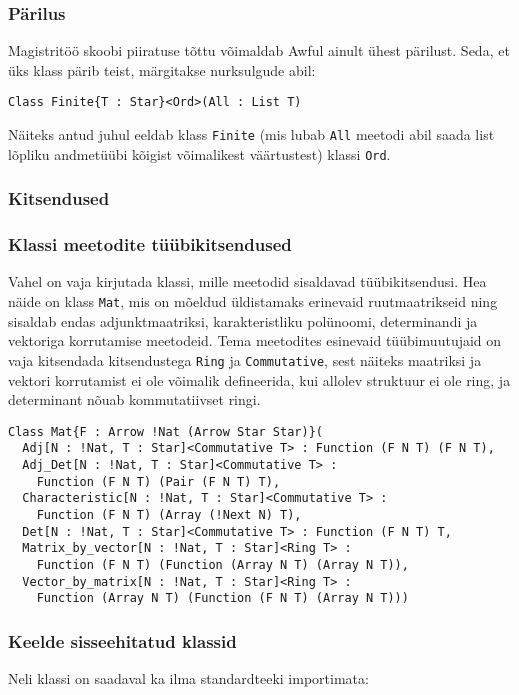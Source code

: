 \documentclass[12pt]{article}
\begin{document}
      \subsubsection{Pärilus}
        Magistritöö skoobi piiratuse tõttu võimaldab Awful ainult ühest pärilust. Seda, et üks klass pärib teist, märgitakse nurksulgude abil:

        \begin{verbatim}Class Finite{T : Star}<Ord>(All : List T)\end{verbatim}

        Näiteks antud juhul eeldab klass \verb!Finite! (mis lubab \verb!All! meetodi abil saada list lõpliku andmetüübi kõigist võimalikest väärtustest) klassi \verb!Ord!.
      \subsubsection{Kitsendused}
        
      \subsubsection{Klassi meetodite tüübikitsendused}
        Vahel on vaja kirjutada klassi, mille meetodid sisaldavad tüübikitsendusi. Hea näide on klass \verb!Mat!, mis on mõeldud üldistamaks erinevaid ruutmaatrikseid ning sisaldab endas adjunktmaatriksi, karakteristliku polünoomi, determinandi ja vektoriga korrutamise meetodeid. Tema meetodites esinevaid tüübimuutujaid on vaja kitsendada kitsendustega \verb!Ring! ja \verb!Commutative!, sest näiteks maatriksi ja vektori korrutamist ei ole võimalik defineerida, kui allolev struktuur ei ole ring, ja determinant nõuab kommutatiivset ringi.

        \begin{verbatim}Class Mat{F : Arrow !Nat (Arrow Star Star)}(
  Adj[N : !Nat, T : Star]<Commutative T> : Function (F N T) (F N T),
  Adj_Det[N : !Nat, T : Star]<Commutative T> :
    Function (F N T) (Pair (F N T) T),
  Characteristic[N : !Nat, T : Star]<Commutative T> :
    Function (F N T) (Array (!Next N) T),
  Det[N : !Nat, T : Star]<Commutative T> : Function (F N T) T,
  Matrix_by_vector[N : !Nat, T : Star]<Ring T> :
    Function (F N T) (Function (Array N T) (Array N T)),
  Vector_by_matrix[N : !Nat, T : Star]<Ring T> :
    Function (Array N T) (Function (F N T) (Array N T)))\end{verbatim}
      \subsubsection{Keelde sisseehitatud klassid}\label{klassmaatriks}
        Neli klassi on saadaval ka ilma standardteeki importimata:
\end{document}
